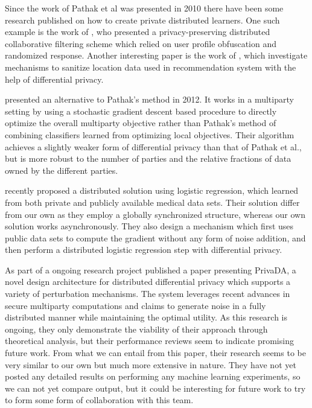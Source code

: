Since the work of Pathak et al was presented in 2010 there have been some research published on how to create private distributed learners. One such example is the work of \cite{boutet2013DisCollFil}, who presented a privacy-preserving distributed collaborative filtering scheme which relied on user profile obfuscation and randomized response. Another interesting paper is the work of \cite{zhang2014locationRecommendation}, which investigate mechanisms to sanitize location data used in recommendation system with the help of differential privacy. 

\cite{rajkumar2012differentially} presented an alternative to Pathak's method in 2012. It works in a multiparty setting by using a stochastic gradient descent based procedure to directly optimize the overall multiparty objective rather than Pathak's method of combining classifiers learned from optimizing local objectives. Their algorithm achieves a slightly weaker form of differential privacy than that of Pathak et al., but is more robust to the number of parties and the relative fractions of data owned by the different parties.

\cite{ji2014DisLogReg} recently proposed a distributed solution using logistic regression, which learned from both private and publicly available medical data sets. Their solution differ from our own as they employ a globally synchronized structure, whereas our own solution works asynchronously. They also design a mechanism which first uses public data sets to compute the gradient without any form of noise addition, and then perform a distributed logistic regression step with differential privacy. 

As part of a ongoing research project \cite{eigner2014privada} published a paper presenting PrivaDA, a novel design architecture for distributed differential privacy which supports a variety of perturbation mechanisms. The system leverages recent advances in secure multiparty computations and claims to generate noise in a fully distributed manner while maintaining the optimal utility. As this research is ongoing, they only demonstrate the viability of their approach through theoretical analysis, but their performance reviews seem to indicate promising future work. From what we can entail from this paper, their research seems to be very similar to our own but much more extensive in nature. They have not yet posted any detailed results on performing any machine learning experiments, so we can not yet compare output, but it could be interesting for future work to try to form some form of collaboration with this team. 


